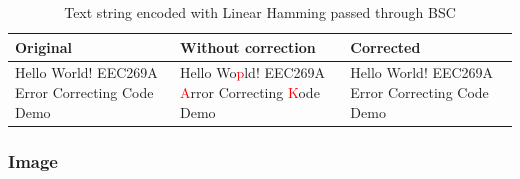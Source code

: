 \documentclass{article}
\begin{document}
\begin{table}[htb]
    \centering
    \caption{Text string encoded with Linear Hamming passed through BSC}
    \label{tab:text-linear-bsc}
    \renewcommand{\arraystretch}{1.5}
    \begin{tabulary}{\textwidth}{ |L|L|L| } 
    \hline
    \textbf{Original} & \textbf{Without correction} & \textbf{Corrected} \\
    \hline
    Hello World! EEC269A Error Correcting Code Demo & Hello Wo\textcolor{red}{p}ld! EEC269A \textcolor{red}{A}rror Correcting \textcolor{red}{K}ode Demo & Hello World! EEC269A Error Correcting Code Demo \\
    \hline
    \end{tabulary}
\end{table}




\subsubsection{Image}
\end{document}
